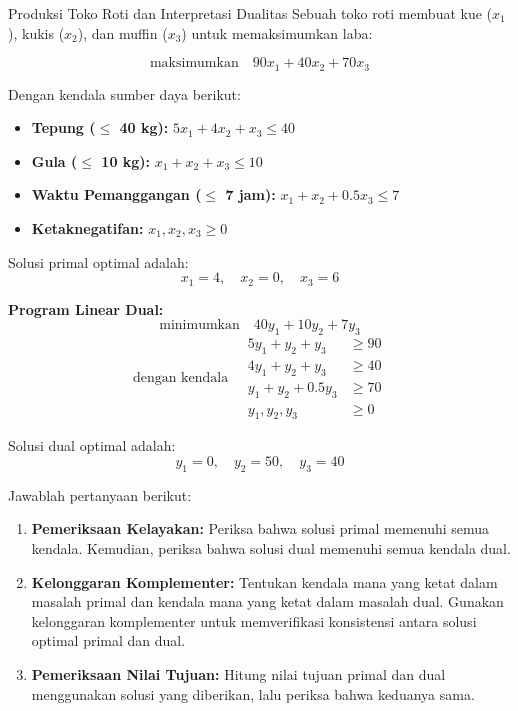 \begin{ex}{Produksi Toko Roti dan Interpretasi Dualitas}{}
\label{ex:cs-bakery-duality}
 Sebuah toko roti membuat kue ($x_1$), kukis ($x_2$), dan muffin ($x_3$) untuk memaksimumkan laba:

\[
\text{maksimumkan} \quad 90x_1 + 40x_2 + 70x_3
\]

Dengan kendala sumber daya berikut:
\begin{itemize}
  \item \textbf{Tepung ($\leq$ 40 kg):} \quad $5x_1 + 4x_2 + x_3 \leq 40$
  \item \textbf{Gula ($\leq$ 10 kg):} \quad $x_1 + x_2 + x_3 \leq 10$
  \item \textbf{Waktu Pemanggangan ($\leq$ 7 jam):} \quad $x_1 + x_2 + 0.5x_3 \leq 7$
  \item \textbf{Ketaknegatifan:} \quad $x_1, x_2, x_3 \geq 0$
\end{itemize}

Solusi primal optimal adalah:
\[
x_1 = 4, \quad x_2 = 0, \quad x_3 = 6
\]

\textbf{Program Linear Dual:}
\[
\text{minimumkan} \quad 40y_1 + 10y_2 + 7y_3
\]
\[
\text{dengan kendala} \quad
\begin{aligned}
5y_1 + y_2 + y_3 &\geq 90 \\
4y_1 + y_2 + y_3 &\geq 40 \\
y_1 + y_2 + 0.5y_3 &\geq 70 \\
y_1, y_2, y_3 &\geq 0
\end{aligned}
\]

Solusi dual optimal adalah:
\[
y_1 = 0, \quad y_2 = 50, \quad y_3 = 40
\]

Jawablah pertanyaan berikut:

\begin{enumerate}
  \item \textbf{Pemeriksaan Kelayakan:}
  Periksa bahwa solusi primal memenuhi semua kendala. Kemudian, periksa bahwa solusi dual memenuhi semua kendala dual.

  \item \textbf{Kelonggaran Komplementer:}
  Tentukan kendala mana yang ketat dalam masalah primal dan kendala mana yang ketat dalam masalah dual. Gunakan kelonggaran komplementer untuk memverifikasi konsistensi antara solusi optimal primal dan dual.

  \item \textbf{Pemeriksaan Nilai Tujuan:}
  Hitung nilai tujuan primal dan dual menggunakan solusi yang diberikan, lalu periksa bahwa keduanya sama.


\end{enumerate}
\end{ex}
